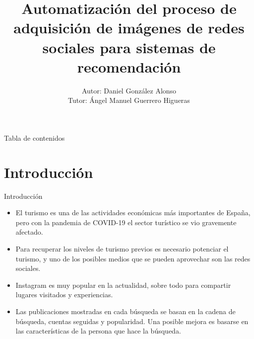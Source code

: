 \documentclass[aspectratio=149]{beamer}
\title[Automatización del proceso de adquisición de imágenes de redes sociales para sistemas de recomendación]{Automatización del proceso de adquisición de imágenes de redes sociales para sistemas de recomendación}
\author[Daniel González Alonso]{
    Autor: Daniel González Alonso\\[1ex] 
    Tutor: Ángel Manuel Guerrero Higueras}
\institute[Universidad de Valladolid]
{
    Máster Universitario en Inteligencia de Negocio \\[-4pt]
    y Big Data en Entornos Seguros
}
\begin{document}
\begin{frame}[label=title, plain]
    \titlepage
\end{frame}

\begin{frame}[label=toc]{Tabla de contenidos}
 \setlength{\leftskip}{5cm}%
 \tableofcontents[subsectionstyle=hide]
\end{frame}

\section{Introducción}
\begin{frame}[label=intro]{Introducción}
    \begin{itemize}
        \item El turismo es una de las actividades económicas más importantes de España, pero con la pandemia de COVID-19 el sector turístico se vio gravemente afectado.
        \item Para recuperar los niveles de turismo previos es necesario potenciar el turismo, y uno de los posibles medios que se pueden aprovechar son las redes sociales.
        \item Instagram es muy popular en la actualidad, sobre todo para compartir lugares visitados y experiencias.
        \item Las publicaciones mostradas en cada búsqueda se basan en la cadena de búsqueda, cuentas seguidas y popularidad. Una posible mejora es basarse en las características de la persona que hace la búsqueda.
    \end{itemize}
\end{frame}

\end{document}
